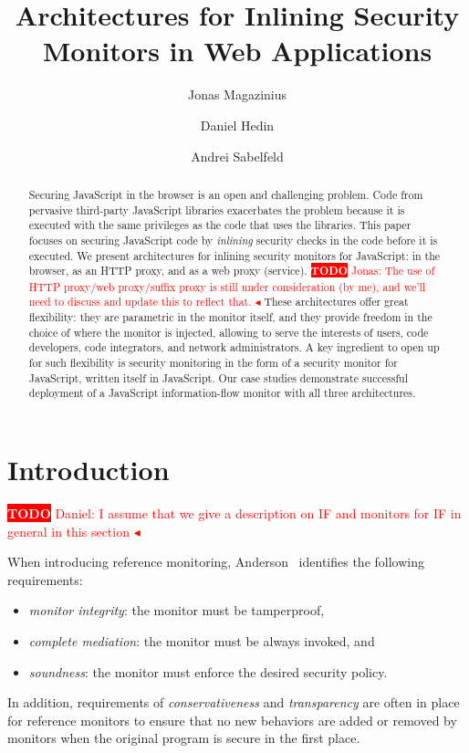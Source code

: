 \documentclass{llncs}
\title{Architectures for Inlining Security Monitors in Web Applications}
\author{Jonas Magazinius \and Daniel Hedin \and Andrei Sabelfeld}
\institute{Chalmers University of Technology, Gothenburg, Sweden}
\newcommand{\todo}[1]{\colorbox{red}{\textcolor{white}{\sffamily\bfseries\scriptsize TODO}} \textcolor{red}{#1} \textcolor{red}{$\blacktriangleleft$}}
\begin{document}
\maketitle



\begin{abstract}
Securing JavaScript in the browser is an open and challenging
problem. Code from pervasive third-party JavaScript libraries exacerbates the
problem because it is executed with the same privileges as the code
that uses the libraries.
%
This paper focuses on securing JavaScript code by \emph{inlining}
security checks in the code before it is executed. We present
architectures for inlining security monitors for JavaScript: in
the browser, as an HTTP proxy, and as a web proxy (service). 
%
\todo{Jonas: The use of HTTP proxy/web proxy/suffix proxy is still under consideration (by me), and we'll need to discuss and update this to reflect that.}
%
These architectures offer great flexibility: they are parametric in the monitor itself,
and they provide freedom in the choice of where the monitor is
injected, allowing to serve the interests of users, code developers, code
integrators, and network administrators.
%
A key ingredient to open up for such flexibility is security monitoring in the form of a
security monitor for JavaScript, written itself in JavaScript.
%
Our case studies demonstrate successful deployment of a JavaScript
information-flow monitor with all three architectures.
\end{abstract}










\section{Introduction}
\label{sec:intro}

\todo{Daniel: I assume that we give a description on IF and monitors for IF in general in this section}

When introducing reference monitoring, Anderson~\cite{Anderson:72}
identifies the following requirements:
\begin{itemize}
\item \emph{monitor integrity}: the monitor must be tamperproof,
\item \emph{complete mediation}: the monitor must be always invoked, and
\item \emph{soundness}: the monitor must enforce the desired
  security policy.
\end{itemize}
In addition, requirements of \emph{conservativeness} and
\emph{transparency} are often in place for reference monitors to
ensure that no new behaviors are added or removed by monitors when the
original program is secure in the first place.
\end{document}
